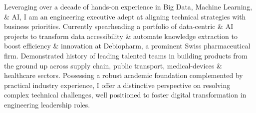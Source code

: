 

\begin{cvparagraph}

Leveraging over a decade of hands-on experience in Big Data, Machine Learning, \& AI, I am an engineering executive adept at aligning technical strategies with business priorities. 
Currently spearheading a portfolio of data-centric \& AI projects to transform data accessibility \& automate knowledge extraction to boost efficiency \& innovation at Debiopharm, a prominent Swiss pharmaceutical firm.
Demonstrated history of leading talented teams in building products from the ground up across supply chain, public transport, medical-devices \& healthcare sectors.
Possessing a robust academic foundation complemented by practical industry experience, I offer a distinctive perspective on resolving complex technical challenges, well positioned to foster digital transformation in engineering leadership roles.
\end{cvparagraph}

\vspace{-0.5cm}